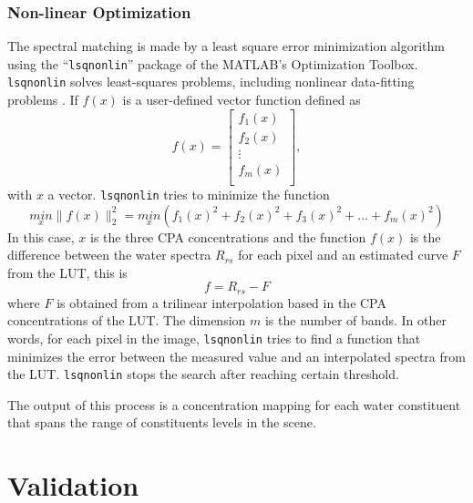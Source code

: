 \subsubsection{Non-linear Optimization}
The spectral matching is made by a least square error minimization algorithm using the ``\texttt{lsqnonlin}'' package of the MATLAB's Optimization Toolbox. \texttt{lsqnonlin} solves least-squares problems, including nonlinear data-fitting problems . If $f(x)$ is a user-defined vector function defined as
\begin{equation}
  f(x)=
  \left[
    \begin{array}{c}
      f_1(x) \\
      f_2(x) \\
      \vdots \\
      f_m(x) \\
    \end{array}
  \right],
\end{equation}
with $x$ a vector. \texttt{lsqnonlin} tries to minimize the function
\begin{equation}
  \underset{x}{min}\parallel f(x) \parallel^2_2=\underset{x}{min}(f_1(x)^2+f_2(x)^2+f_3(x)^2+...+f_m(x)^2)
\end{equation}
In this case, $x$ is the three CPA concentrations and the function $f(x)$ is the difference between the water spectra $R_{rs}$ for each pixel and an estimated curve $F$ from the LUT, this is
\begin{equation}
  f = R_{rs} - F
\end{equation}
where $F$ is obtained from a trilinear interpolation based in the CPA concentrations of the LUT. The dimension $m$ is the number of bands. In other words, for each pixel in the image, \texttt{lsqnonlin} tries to find a function that minimizes the error between the measured value and an interpolated spectra from the LUT. \texttt{lsqnonlin} stops the search after reaching certain threshold. 

The output of this process is a concentration mapping for each water constituent that spans the range of constituents levels in the scene. 

\section{Validation} 
\label{sec:val}
